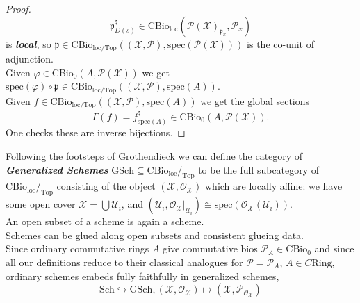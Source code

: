 \documentclass[leqno]{article}
\renewcommand{\top}{\text{Top}}
\newcommand{\sch}{\text{Sch}}
\newcommand{\xspace}{\mathcal{X}}
\newcommand{\pid}{\mathfrak{p}}
\newcommand{\myemph}[1]{{\it{\bf{#1}}}}
\newcommand{\biop}{\mathscr{P}}
\numberwithin{equation}{section}
\begin{document}
\begin{proof}
\begin{equation}
								\pid^{\natural}_{D(s)}\in \text{CBio}_{\text{loc}}\left(
								\biop(\xspace)_{\pid_{x}},\biop_{x} \right)
								\label{eq:7.6}
				\end{equation}
				is \myemph{local}, so $\pid\in
				\text{CBio}_{\text{loc}/\top}\left((\xspace,\biop),\text{spec}\left(\biop( \xspace )\right)\right)$
is the co-unit of adjunction. \vspace{.1cm}\\
				Given $\varphi\in \text{CBio}_0\left(
				A,\biop(\xspace) \right)$ we get $\text{spec}(\varphi)\circ\pid\in
				\text{CBio}_{\text{loc}/\top}\left( (\xspace,\biop),\text{spec} (A) \right)$.
				\vspace{.1cm}\\
				Given  $f\in \text{CBio}_{\text{loc}/\top}\left(
				(\xspace,\biop),\text{spec}(A) \right)$ we get the global sections 
				\begin{equation}
								\Gamma(f)=f_{\text{spec}(A)}^{\natural}\in \text{CBio}_0(A,\biop(\xspace)).
								\label{eq:7.7}
				\end{equation}
				One  checks these are inverse bijections.
\end{proof}
\noindent Following the footsteps of Grothendieck
we can define the category of \break
\myemph{Generalized Schemes} $\text{GSch} \subseteq
\text{CBio}_{\text{loc}}/_{\top}$ to be the full subcategory of
				$\text{CBio}_{\text{loc}}/_{\top}$ consisting of the object
				$(\xspace,\mathscr{O}_{\xspace})$ which are locally affine: we have some open
				cover $\xspace=\bigcup
				\mathscr{U}_{i}$, and $(\mathscr{U}_{i},\mathscr{O}_{\xspace}|_{\mathscr{U}_{i}})\cong
				\text{spec}\left(\mathscr{O}_{\xspace}(\mathscr{U}_{i})\right)$. \vspace{.1cm}\\
An open subset of a scheme is again a scheme. \vspace{.1cm}\\
Schemes can be glued along open subsets and consistent glueing data.
				\vspace{.1cm}\\
				Since ordinary commutative rings $A$ give commutative bios $\biop_{A}\in
				\text{CBio}_0$ and since all our definitions reduce to their classical analogues for
				$\biop=\biop_{A}$, $A\in C\text{Ring}$, ordinary schemes embeds fully faithfully in generalized
				schemes, 
				$$\sch\hookrightarrow \text{GSch},
(\xspace,\mathscr{O}_{\xspace})\mapsto (\xspace,\biop_{\mathscr{O}_{\xspace}})$$
\end{document}
